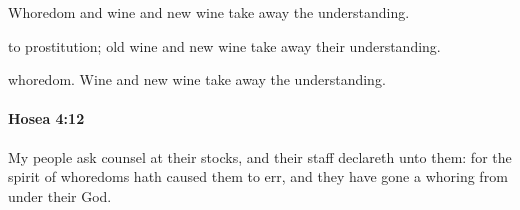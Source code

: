 			\begin{versebox}
					\item[BHS] 
					\item[LXX] 
					\item[ASV] Whoredom and wine and new wine take away the understanding.
					\item[NIV] to prostitution; old wine and new wine take away their understanding.
					\item[NRSV] whoredom. Wine and new wine take away the understanding.
			\end{versebox}

		\paragraph{Hosea 4:12} %
			\label{HOSEA-4-12}

			My people ask counsel at their stocks, and their staff declareth unto them: for the spirit of whoredoms hath caused them to err, and they have gone a whoring from under their God.

